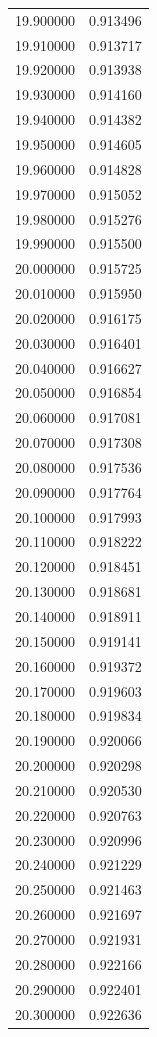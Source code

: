 \begin{tabular}{rr}
19.900000 & 0.913496 \\
19.910000 & 0.913717 \\
19.920000 & 0.913938 \\
19.930000 & 0.914160 \\
19.940000 & 0.914382 \\
19.950000 & 0.914605 \\
19.960000 & 0.914828 \\
19.970000 & 0.915052 \\
19.980000 & 0.915276 \\
19.990000 & 0.915500 \\
20.000000 & 0.915725 \\
20.010000 & 0.915950 \\
20.020000 & 0.916175 \\
20.030000 & 0.916401 \\
20.040000 & 0.916627 \\
20.050000 & 0.916854 \\
20.060000 & 0.917081 \\
20.070000 & 0.917308 \\
20.080000 & 0.917536 \\
20.090000 & 0.917764 \\
20.100000 & 0.917993 \\
20.110000 & 0.918222 \\
20.120000 & 0.918451 \\
20.130000 & 0.918681 \\
20.140000 & 0.918911 \\
20.150000 & 0.919141 \\
20.160000 & 0.919372 \\
20.170000 & 0.919603 \\
20.180000 & 0.919834 \\
20.190000 & 0.920066 \\
20.200000 & 0.920298 \\
20.210000 & 0.920530 \\
20.220000 & 0.920763 \\
20.230000 & 0.920996 \\
20.240000 & 0.921229 \\
20.250000 & 0.921463 \\
20.260000 & 0.921697 \\
20.270000 & 0.921931 \\
20.280000 & 0.922166 \\
20.290000 & 0.922401 \\
20.300000 & 0.922636 \\

\end{tabular}
